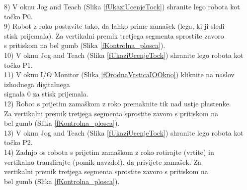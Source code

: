 \begin{mdframed}[backgroundcolor=blue!20, shadow=true,roundcorner=8pt]
\hspace*{0.05cm} 8) V oknu Jog and Teach (Slika \ref{fUkaziUcenjeTock}) shranite lego robota kot točko P0. \vspace*{0.3cm} \\ %
\hspace*{0.05cm} 9) Robot z roko postavite tako, da lahko prime zamašek (lega, ki ji sledi \\ %
\hspace*{0.5cm} stisk prijemala). Za vertikalni premik tretjega segmenta sprostite zavoro \\ %
\hspace*{0.5cm} s pritiskom na bel gumb (Slika \ref{fKontrolna_plosca}). \vspace*{0.3cm} \\ %
10) V oknu Jog and Teach (Slika \ref{fUkaziUcenjeTock}) shranite lego robota kot točko P1. \vspace*{0.3cm} \\ %
11) V oknu I/O Monitor (Slika \ref{fOrodnaVrsticaIOOkno}) kliknite na naslov izhodnega digitalnega \\ %
\hspace*{0.55cm} signala 0 za stisk prijemala. \vspace*{0.3cm} \\ %
12) Robot s prijetim zamaškom z roko premaknite tik nad ustje plastenke. \\ %
\hspace*{0.55cm} Za vertikalni premik tretjega segmenta sprostite zavoro s pritiskom na \\ %
\hspace*{0.55cm} bel gumb (Slika \ref{fKontrolna_plosca}). \vspace*{0.3cm} \\ %
13) V oknu Jog and Teach (Slika \ref{fUkaziUcenjeTock}) shranite lego robota kot točko P2.  \vspace*{0.3cm} \\ %
14) Zadnjo os robota s prijetim zamaškom z roko rotirajte (vrtite) in \\ %
\hspace*{0.55cm} vertikalno translirajte (pomik navzdol), da privijete zamašek.  Za \\ %
\hspace*{0.55cm} vertikalni premik tretjega segmenta sprostite zavoro s pritiskom na \\ %
\hspace*{0.55cm} bel gumb (Slika \ref{fKontrolna_plosca}). \vspace*{0.3cm} \\ %

\end{mdframed}
